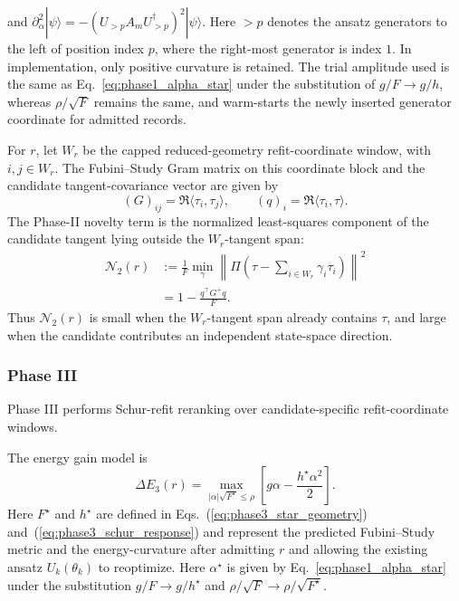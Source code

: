\documentclass[
  reprint,
  amsmath,
  amssymb,
  aps,
  pra,
  nofootinbib,
  superscriptaddress,
  floatfix
]{revtex4-2}
\newcommand{\ket}[1]{|#1\rangle}
\begin{document}
and $\partial^2_{\alpha}\ket{\psi} =-(U_{>p}A_mU_{>p}^{\dagger})^2\ket{\psi}.$ Here \(>p\) denotes the ansatz generators to the left of position index \(p\), where the right-most generator is index \(1\). In implementation, only positive curvature is retained. The trial amplitude used is the same as Eq.~\ref{eq:phase1_alpha_star} under the substitution of $g/F \to g / h$, whereas $\rho/\sqrt{F}$ remains the same, and warm-starts the newly inserted generator coordinate for admitted records.

For \(r\), let \(W_r\) be the capped reduced-geometry refit-coordinate window, with \(i,j\in W_r\). The Fubini--Study Gram matrix on this coordinate block and the candidate tangent-covariance vector are given by
\begin{equation*}
(G)_{ij}=\Re\langle\tau_i,\tau_j\rangle,
\qquad
(q)_i=\Re\langle\tau_i,\tau\rangle.
\end{equation*}
The Phase-II novelty term is the normalized least-squares component of the candidate tangent lying outside the \(W_r\)-tangent span:
\begin{equation}
\begin{aligned}
\mathcal N_2(r)
&:=
\frac{1}{F}
\min_{\gamma}
\left\|
\Pi\left(\tau-\sum_{i\in W_r}\gamma_i\tau_i\right)
\right\|^2 \\
&=
1-
\frac{q^{\top}G^+q}{F}.
\end{aligned}
\label{eq:phase2_novelty}
\end{equation}
Thus $\mathcal N_2(r)$ is small when the \(W_r\)-tangent span already contains $\tau$, and large when the candidate contributes an independent state-space direction.

\subsubsection{Phase III}

Phase III performs Schur-refit reranking over candidate-specific refit-coordinate windows.

The energy gain model is
\begin{equation}
\Delta E_{3}(r)=
\max_{|\alpha|\sqrt{F^\star}\le\rho}
\left[g\alpha-\frac{h^\star \alpha^2}{2}\right].
\label{eq:phase3_gain}
\end{equation}
Here $F^\star$ and $h^\star$ are defined in Eqs.~(\ref{eq:phase3_star_geometry}) and~(\ref{eq:phase3_schur_response}) and represent the predicted Fubini--Study metric and the energy-curvature after admitting $r$ and allowing the existing ansatz $U_k(\theta_k)$ to reoptimize. Here $\alpha^\star$ is given by Eq.~\ref{eq:phase1_alpha_star} under the substitution $g/F \to g/h^\star$ and $\rho / \sqrt{F} \to \rho / \sqrt{F^\star}$.
\end{document}
